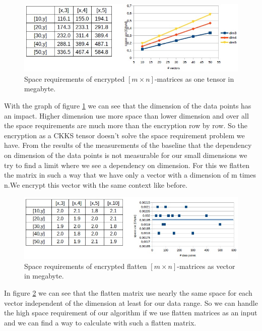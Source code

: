 \begin{figure}[ht]
\centering
\includegraphics[width=1\linewidth]{images/tensor.jpg}
\caption{Space requirements of encrypted $[m\times n]$-matrices as one tensor in megabyte.}
\label{fig:tensor}
\end{figure} 

\begin{text}
With the graph of figure \ref{fig:tensor} we can see that the dimension of the data points has an impact. Higher dimension use more space than lower dimension and over all the space requirements are much more than the encryption row by row. So the encryption as a CKKS tensor doesn't solve the space requirement problem we have. \newline
From the results of the measurements of the baseline that the dependency on dimension of the data points is not measurable for our small dimensions we try to find a limit where we see a dependency on dimension. For this we flatten the matrix in such a way that we have only a vector with a dimension of m times n.We encrypt this vector with the same context like before.
\end{text}

\begin{figure}[ht]
\centering
\includegraphics[width=1\linewidth]{images/flatten.jpg}
\caption{Space requirements of encrypted flatten $[m\times n]$-matrices as vector in megabyte.}
\label{fig:flatten}
\end{figure} 

\begin{text}
In figure \ref{fig:flatten} we can see that the flatten matrix use nearly the same space for each vector independent of the dimension at least for our data range. So we can handle the high space requirement of our algorithm if we use flatten matrices as an input and we can find a way to calculate with such a flatten matrix.
\end{text}

